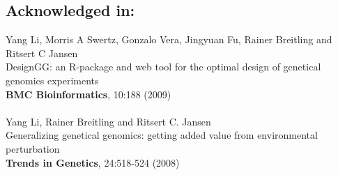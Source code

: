 \documentclass[8pt, twoside, a5paper]{report}
\newcommand{\authors}[1]{\small{#1}}
\newcommand{\bold}[1]{{\bfseries #1}}
\begin{document}
\subsection*{Acknowledged in:}
  \authors{Yang Li, Morris A Swertz, Gonzalo Vera, Jingyuan Fu, Rainer Breitling and Ritsert C Jansen}\\
  DesignGG: an R-package and web tool for the optimal design of genetical genomics experiments\\
  \bold{BMC Bioinformatics}, 10:188 (2009)\\\\
  \authors{Yang Li, Rainer Breitling and Ritsert C. Jansen}\\
  Generalizing genetical genomics: getting added value from environmental perturbation\\
  \bold{Trends in Genetics}, 24:518-524 (2008)


{\footnotesize

}
\end{document}
